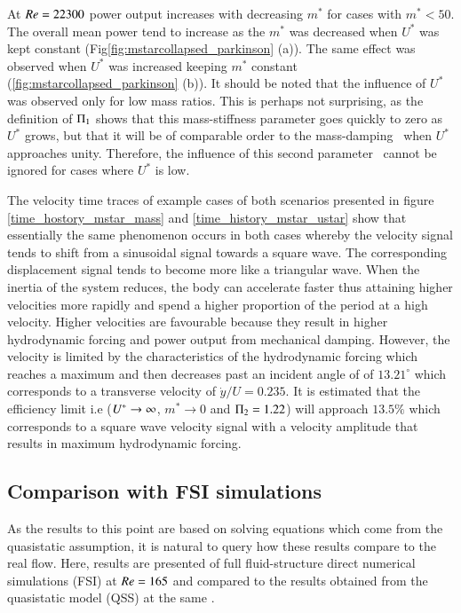 At $Re=22300$ power output increases with decreasing $m^*$ for cases with $m^*<50$. The overall mean power tend to increase as the $m^*$ was decreased when $U^*$ was kept constant (Fig\ref{fig:mstarcollapsed_parkinson} (a)). The same effect was observed when $U^*$ was increased keeping $m^*$ constant (\ref{fig:mstarcollapsed_parkinson} (b)). It should be noted that the influence of $U^*$ was observed only for low mass ratios. This is perhaps not surprising, as the definition of $\Pi_1$ shows that this mass-stiffness parameter goes quickly to zero as $U^*$ grows, but that it will be of comparable order to the mass-damping \massdamp\ when $U^*$ approaches unity. Therefore, the influence of this second parameter \massstiff\ cannot be ignored for cases where $U^*$ is low.

The velocity time traces of example cases of both scenarios presented in figure \ref{time_hostory_mstar_mass} and \ref{time_history_mstar_ustar} show that essentially the same phenomenon occurs in both cases whereby the velocity signal tends to shift from a sinusoidal signal towards a square wave. The corresponding displacement signal tends to become more like a triangular wave. When the inertia of the system reduces, the body can accelerate faster thus attaining higher velocities more rapidly and spend a higher proportion of the period at a high velocity. Higher velocities are favourable because they result in higher hydrodynamic forcing and power output from mechanical damping. However, the velocity is limited by the characteristics of the hydrodynamic forcing which reaches a maximum and then decreases past an incident angle of of $13.21^{\circ}$ which corresponds to a transverse velocity of $\dot{y}/U=0.235$. It is estimated that the efficiency limit i.e ($U^{*} \rightarrow \infty$, $m^* \rightarrow 0$ and $\Pi_2=1.22$) will approach $13.5\%$ which corresponds to a square wave velocity signal with a velocity amplitude that results in maximum  hydrodynamic forcing.







\subsection{Comparison with FSI simulations}
As the results to this point are based on solving equations which come from the quasistatic assumption, it is natural to query how these results compare to the real flow. Here, results are presented of full fluid-structure direct numerical simulations (FSI) at $Re=165$ and compared to the results obtained from the quasistatic model (QSS) at the same \reynoldsnumber.

